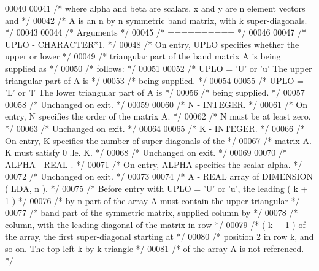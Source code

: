 \begin{DoxyCode}
00040 
00041 \textcolor{comment}{/*  where alpha and beta are scalars, x and y are n element vectors and */}
00042 \textcolor{comment}{/*  A is an n by n symmetric band matrix, with k super-diagonals. */}
00043 
00044 \textcolor{comment}{/*  Arguments */}
00045 \textcolor{comment}{/*  ========== */}
00046 
00047 \textcolor{comment}{/*  UPLO   - CHARACTER*1. */}
00048 \textcolor{comment}{/*           On entry, UPLO specifies whether the upper or lower */}
00049 \textcolor{comment}{/*           triangular part of the band matrix A is being supplied as */}
00050 \textcolor{comment}{/*           follows: */}
00051 
00052 \textcolor{comment}{/*              UPLO = 'U' or 'u'   The upper triangular part of A is */}
00053 \textcolor{comment}{/*                                  being supplied. */}
00054 
00055 \textcolor{comment}{/*              UPLO = 'L' or 'l'   The lower triangular part of A is */}
00056 \textcolor{comment}{/*                                  being supplied. */}
00057 
00058 \textcolor{comment}{/*           Unchanged on exit. */}
00059 
00060 \textcolor{comment}{/*  N      - INTEGER. */}
00061 \textcolor{comment}{/*           On entry, N specifies the order of the matrix A. */}
00062 \textcolor{comment}{/*           N must be at least zero. */}
00063 \textcolor{comment}{/*           Unchanged on exit. */}
00064 
00065 \textcolor{comment}{/*  K      - INTEGER. */}
00066 \textcolor{comment}{/*           On entry, K specifies the number of super-diagonals of the */}
00067 \textcolor{comment}{/*           matrix A. K must satisfy  0 .le. K. */}
00068 \textcolor{comment}{/*           Unchanged on exit. */}
00069 
00070 \textcolor{comment}{/*  ALPHA  - REAL            . */}
00071 \textcolor{comment}{/*           On entry, ALPHA specifies the scalar alpha. */}
00072 \textcolor{comment}{/*           Unchanged on exit. */}
00073 
00074 \textcolor{comment}{/*  A      - REAL             array of DIMENSION ( LDA, n ). */}
00075 \textcolor{comment}{/*           Before entry with UPLO = 'U' or 'u', the leading ( k + 1 ) */}
00076 \textcolor{comment}{/*           by n part of the array A must contain the upper triangular */}
00077 \textcolor{comment}{/*           band part of the symmetric matrix, supplied column by */}
00078 \textcolor{comment}{/*           column, with the leading diagonal of the matrix in row */}
00079 \textcolor{comment}{/*           ( k + 1 ) of the array, the first super-diagonal starting at */}
00080 \textcolor{comment}{/*           position 2 in row k, and so on. The top left k by k triangle */}
00081 \textcolor{comment}{/*           of the array A is not referenced. */}

\end{DoxyCode}
